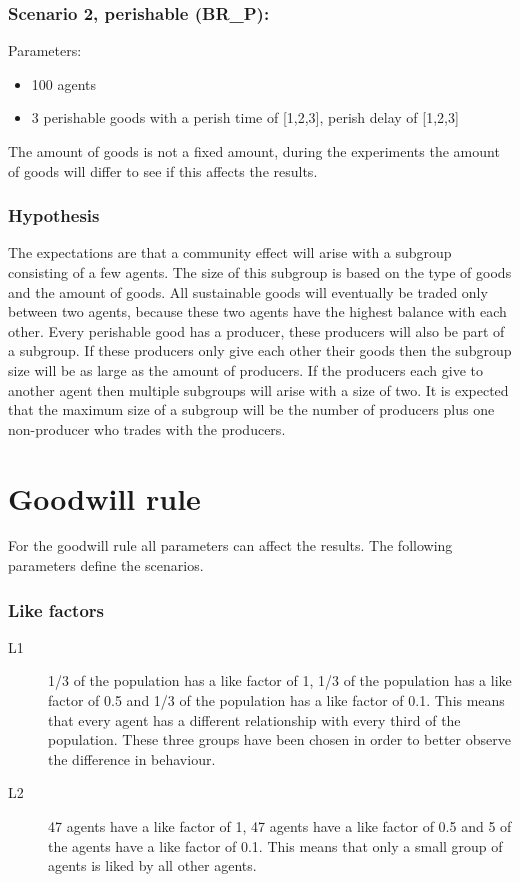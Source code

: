 \documentclass[twoside,openright]{uva-bachelor-thesis}
\begin{document}
\subsubsection{Scenario 2, perishable (BR\_P):}
Parameters:
\begin{itemize}
\item 100 agents
\item 3 perishable goods with a perish time of [1,2,3], perish delay of [1,2,3]
\end{itemize}
The amount of goods is not a fixed amount, during the experiments the amount of goods will differ to see if this affects the results.

\subsubsection{Hypothesis}
The expectations are that a community effect will arise with a subgroup consisting of a few agents. The size of this subgroup is based on the type of goods and the amount of goods. All sustainable goods will eventually be traded only between two agents, because these two agents have the highest balance with each other. Every perishable good has a producer, these producers will also be part of a subgroup. If these producers only give each other their goods then the subgroup size will be as large as the amount of producers. If the producers each give to another agent then multiple subgroups will arise with a size of two. It is expected that the maximum size of a subgroup will be the number of producers plus one non-producer who trades with the producers.

\section{Goodwill rule}
For the goodwill rule all parameters can affect the results. The following parameters define the scenarios.
\subsubsection{Like factors}
\begin{description}
\item[L1] 1/3 of the population has a like factor of 1, 1/3 of the population has a like factor of 0.5 and 1/3 of the population has a like factor of 0.1. This means that every agent has a different relationship with every third of the population. These three groups have been chosen in order to better observe the difference in behaviour.
\item[L2] 47 agents have a like factor of 1, 47 agents have a like factor of 0.5 and 5 of the agents have a like factor of 0.1. This means that only a small group of agents is liked by all other agents.
\end{description}
\end{document}
